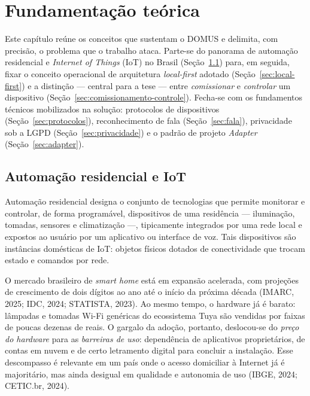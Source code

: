 \section{Fundamentação teórica}\label{cap:fundamentacao}

Este capítulo reúne os conceitos que sustentam o DOMUS e delimita, com precisão,
o problema que o trabalho ataca. Parte-se do panorama de automação residencial e
\textit{Internet of Things} (IoT) no Brasil (Seção~\ref{sec:automacao-iot}) para,
em seguida, fixar o conceito operacional de arquitetura \textit{local-first}
adotado (Seção~\ref{sec:local-first}) e a distinção --- central para a tese ---
entre \textit{comissionar} e \textit{controlar} um dispositivo
(Seção~\ref{sec:comissionamento-controle}). Fecha-se com os fundamentos técnicos
mobilizados na solução: protocolos de dispositivos (Seção~\ref{sec:protocolos}),
reconhecimento de fala (Seção~\ref{sec:fala}), privacidade sob a LGPD
(Seção~\ref{sec:privacidade}) e o padrão de projeto \textit{Adapter}
(Seção~\ref{sec:adapter}).

\subsection{Automação residencial e IoT}\label{sec:automacao-iot}

Automação residencial designa o conjunto de tecnologias que permite monitorar e
controlar, de forma programável, dispositivos de uma residência --- iluminação,
tomadas, sensores e climatização ---, tipicamente integrados por uma rede local e
expostos ao usuário por um aplicativo ou interface de voz. Tais dispositivos são
instâncias domésticas de IoT: objetos físicos dotados de conectividade que trocam
estado e comandos por rede.

O mercado brasileiro de \textit{smart home} está em expansão acelerada, com
projeções de crescimento de dois dígitos ao ano até o início da próxima década
(IMARC, 2025; IDC, 2024; STATISTA, 2023). Ao mesmo tempo, o hardware já é barato:
lâmpadas e tomadas Wi-Fi genéricas do ecossistema Tuya são vendidas por faixas de
poucas dezenas de reais. O gargalo da adoção, portanto, deslocou-se do
\textit{preço do hardware} para as \textit{barreiras de uso}: dependência de
aplicativos proprietários, de contas em nuvem e de certo letramento digital para
concluir a instalação. Esse descompasso é relevante em um país onde o acesso
domiciliar à Internet já é majoritário, mas ainda desigual em qualidade e
autonomia de uso (IBGE, 2024; CETIC.br, 2024).

